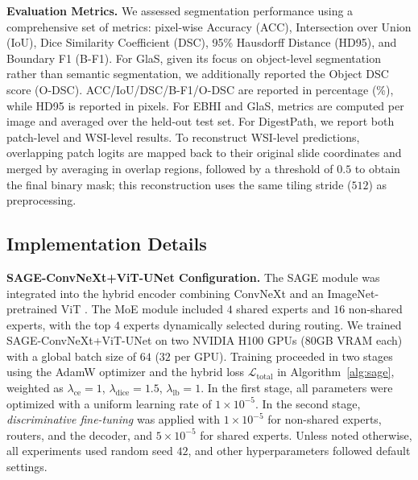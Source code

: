 \noindent\textbf{Evaluation Metrics.}
We assessed segmentation performance using a comprehensive set of metrics: pixel-wise Accuracy (ACC), Intersection over Union (IoU), Dice Similarity Coefficient (DSC), 95\% Hausdorff Distance (HD95), and Boundary F1 (B-F1). For GlaS, given its focus on object-level segmentation rather than semantic segmentation, we additionally reported the Object DSC score (O-DSC).
ACC/IoU/DSC/B-F1/O-DSC are reported in percentage (\%), while HD95 is reported in pixels.
For EBHI and GlaS, metrics are computed per image and averaged over the held-out test set.
For DigestPath, we report both patch-level and WSI-level results.
To reconstruct WSI-level predictions, overlapping patch logits are mapped back to their original slide coordinates and merged by averaging in overlap regions, followed by a threshold of $0.5$ to obtain the final binary mask; this reconstruction uses the same tiling stride ($512$) as preprocessing.


\subsection{Implementation Details}
\label{subsec:implementation}


\noindent\textbf{SAGE-ConvNeXt+ViT-UNet Configuration.}
The SAGE module was integrated into the hybrid encoder combining ConvNeXt \cite{ConvNext} and an ImageNet-pretrained ViT \cite{dosovitskiy2021imageworth16x16words}. The MoE module included $4$ shared experts and $16$ non-shared experts, with the top $4$ experts dynamically selected during routing. We trained SAGE-ConvNeXt+ViT-UNet on two NVIDIA H100 GPUs ($80$GB VRAM each) with a global batch size of $64$ ($32$ per GPU). Training proceeded in two stages using the AdamW optimizer \cite{loshchilov2019decoupledweightdecayregularization} and the hybrid loss $\mathcal{L}_{\text{total}}$ in Algorithm~\ref{alg:sage}, weighted as $\lambda_{\text{ce}} = 1$, $\lambda_{\text{dice}} = 1.5$, $\lambda_{\text{lb}} = 1$. In the first stage, all parameters were optimized with a uniform learning rate of $1\times10^{-5}$. In the second stage, \textit{discriminative fine-tuning} \cite{howard2018universallanguagemodelfinetuning} was applied with $1\times10^{-5}$ for non-shared experts, routers, and the decoder, and $5\times10^{-5}$ for shared experts. Unless noted otherwise, all experiments used random seed $42$, and other hyperparameters followed default settings. 

